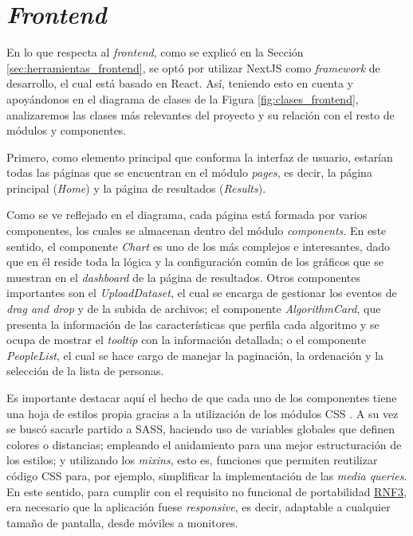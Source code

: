 \section{\textit{Frontend}}

En lo que respecta al \textit{frontend}, como se explicó en la Sección \ref{sec:herramientas_frontend}, se optó
por utilizar NextJS como \textit{framework} de desarrollo, el cual está basado en React. Así, teniendo esto en cuenta y apoyándonos
en el diagrama de clases de la Figura \ref{fig:clases_frontend}, analizaremos
las clases más relevantes del proyecto y su relación con el resto de módulos y componentes.

\bigskip
Primero, como elemento principal que conforma la interfaz de usuario, estarían todas las páginas que se encuentran en el módulo \textit{pages}, es decir,
la página principal (\textit{Home}) y la página de resultados (\textit{Results}).

\bigskip
Como se ve reflejado en el diagrama, cada página está formada por varios componentes, los cuales se almacenan dentro del módulo \textit{components}.
En este sentido, el componente \textit{Chart} es uno de los más complejos e interesantes, dado que en él reside toda la lógica y la configuración común
de los gráficos que se muestran en el \textit{dashboard} de la página de resultados. Otros componentes importantes son el \textit{UploadDataset},
el cual se encarga de gestionar los eventos de \textit{drag and drop} y de la subida de archivos; el componente \textit{AlgorithmCard}, que
presenta la información de las características que perfila cada algoritmo y se ocupa de mostrar el \textit{tooltip} con la información detallada;
o el componente \textit{PeopleList}, el cual se hace cargo de manejar la paginación, la ordenación y la selección de la lista de personas.

\bigskip
Es importante
destacar aquí el hecho de que cada uno de los componentes tiene una hoja de estilos propia gracias a la utilización de los módulos CSS \cite{cssmodules}. A su vez
se buscó sacarle partido a SASS, haciendo uso de variables globales que definen colores o distancias; empleando el anidamiento para una mejor
estructuración de los estilos; y utilizando los \textit{mixins}, esto es, funciones que permiten reutilizar código CSS para, por ejemplo, simplificar la implementación de las \textit{media queries}. En este
sentido, para cumplir con el requisito no funcional de portabilidad \hyperref[req:rnf3]{RNF3},
era necesario que la aplicación fuese \textit{responsive}, es decir, adaptable a cualquier tamaño de pantalla, desde móviles a monitores.

